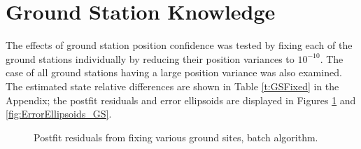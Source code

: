 \documentclass[]{aiaa-tc}%
\begin{document}
	\section{Ground Station Knowledge}
	
	The effects of ground station position confidence was tested by fixing each of the ground stations individually by reducing their position variances to $10^{-10}$.  The case of all ground stations having a large position variance was also examined.  The estimated state relative differences are shown in Table \ref{t:GSFixed} in the Appendix; the postfit residuals and error ellipsoids are displayed in Figures \ref{fig:Postfit_GS} and \ref{fig:ErrorEllipsoids_GS}.
		
	\begin{figure}[H]
		\centering
		\caption{Postfit residuals from fixing various ground sites, batch algorithm. }
		\label{fig:Postfit_GS}
	\end{figure}	
\end{document}
